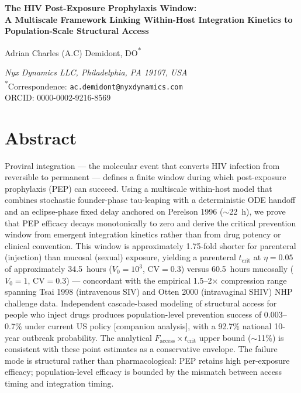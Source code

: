\documentclass[10pt,letterpaper]{article}
\theoremstyle{definition}
\theoremstyle{remark}
\newcommand{\Faccess}{F_{\text{access}}}
\newcommand{\tcrit}{t_{\text{crit}}}
\begin{document}
\linenumbers
\vspace*{0.2in}

\begin{flushleft}
{\LARGE\bfseries The HIV Post-Exposure Prophylaxis Window:\\[0.3em]
A Multiscale Framework Linking Within-Host Integration Kinetics to Population-Scale Structural Access\par}
\vspace{1em}

{\large Adrian Charles (A.C) Demidont, DO\textsuperscript{*}\par}
\vspace{0.5em}
\textit{Nyx Dynamics LLC, Philadelphia, PA 19107, USA}\\[0.3em]
\textsuperscript{*}Correspondence: \texttt{ac.demidont@nyxdynamics.com} \\
ORCID: 0000-0002-9216-8569
\end{flushleft}
\section*{Abstract}
Proviral integration --- the molecular event that converts HIV infection from reversible to permanent --- defines a finite window during which post-exposure prophylaxis (PEP) can succeed. Using a multiscale within-host model that combines stochastic founder-phase tau-leaping with a deterministic ODE handoff and an eclipse-phase fixed delay anchored on Perelson 1996 ($\sim$22~h), we prove that PEP efficacy decays monotonically to zero and derive the critical prevention window from emergent integration kinetics rather than from drug potency or clinical convention. This window is approximately 1.75-fold shorter for parenteral (injection) than mucosal (sexual) exposure, yielding a parenteral $\tcrit$ at $\eta = 0.05$ of approximately 34.5~hours ($V_{0} = 10^{3}$, CV$=0.3$) versus 60.5~hours mucosally ($V_{0} = 1$, CV$=0.3$) --- concordant with the empirical 1.5--2$\times$ compression range spanning Tsai 1998 (intravenous SIV) and Otten 2000 (intravaginal SHIV) NHP challenge data. Independent cascade-based modeling of structural access for people who inject drugs produces population-level prevention success of 0.003--0.7\% under current US policy [companion analysis], with a 92.7\% national 10-year outbreak probability. The analytical $\Faccess \times \tcrit$ upper bound ($\sim$11\%) is consistent with these point estimates as a conservative envelope. The failure mode is structural rather than pharmacological: PEP retains high per-exposure efficacy; population-level efficacy is bounded by the mismatch between access timing and integration timing.
\end{document}
